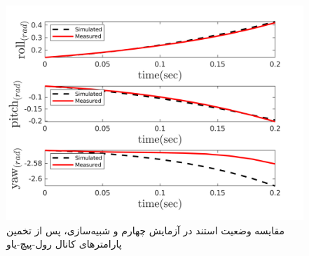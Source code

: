 \begin{figure}[H]
	\includegraphics[width=12cm]{../Figures/RCP/roll_pitch_yaw_parameter_estimation/RCP_roll_pitch_yaw_S5.png}
	\centering
	\caption{مقايسه وضعیت استند در  آزمايش چهارم و شبیه‌سازی، پس از تخمین پارامترهای کانال رول-پیچ-یاو}
	\label{ roll_pitch_yaw_ps4}
\end{figure}
